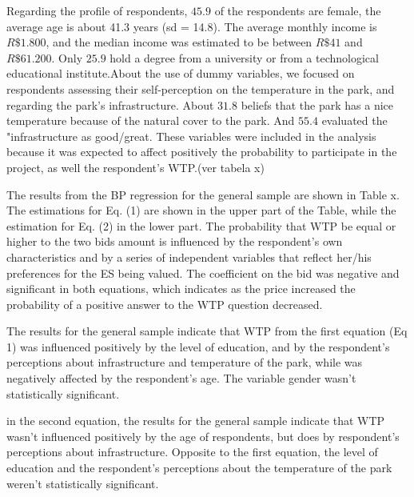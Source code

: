 \documentclass[smallextended]{svjour3}       %
\begin{document}
Regarding the profile of respondents, \(45.9%
\) of the respondents are female, the average age is about 41.3 years
(sd = 14.8). The average monthly income is \(R\$ 1.800\), and the median
income was estimated to be between \(R\$ 41\) and \(R\$ 61.200\). Only
\(25.9%
\) hold a degree from a university or from a technological educational
institute.About the use of dummy variables, we focused on respondents
assessing their self-perception on the temperature in the park, and
regarding the park's infrastructure. About \(31.8%
\) beliefs that the park has a nice temperature because of the natural
cover to the park. And \(55.4%
\) evaluated the "infrastructure as good/great. These variables were
included in the analysis because it was expected to affect positively
the probability to participate in the project, as well the respondent's
WTP.(ver tabela x)

The results from the BP regression for the general sample are shown in
Table x. The estimations for Eq. (1) are shown in the upper part of the
Table, while the estimation for Eq. (2) in the lower part. The
probability that WTP be equal or higher to the two bids amount is
influenced by the respondent's own characteristics and by a series of
independent variables that reflect her/his preferences for the ES being
valued. The coefficient on the bid was negative and significant in both
equations, which indicates as the price increased the probability of a
positive answer to the WTP question decreased.

The results for the general sample indicate that WTP from the first
equation (Eq 1) was influenced positively by the level of education, and
by the respondent's perceptions about infrastructure and temperature of
the park, while was negatively affected by the respondent's age. The
variable gender wasn't statistically significant.

in the second equation, the results for the general sample indicate that
WTP wasn't influenced positively by the age of respondents, but does by
respondent's perceptions about infrastructure. Opposite to the first
equation, the level of education and the respondent's perceptions about
the temperature of the park weren't statistically significant.
\end{document}
